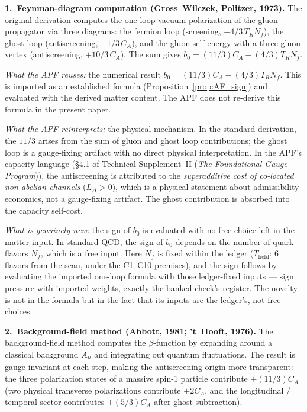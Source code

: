 \documentclass[11pt]{article}
\theoremstyle{definition}
\newcommand{\TSII}{Technical Supplement~II (\emph{The Foundational Gauge Program})}
\begin{document}
\smallskip\noindent\textbf{1.\ Feynman-diagram computation
(Gross--Wilczek, Politzer, 1973).}\quad
The original derivation computes the one-loop vacuum polarization of
the gluon propagator via three diagrams: the fermion loop (screening,
$-4/3\, T_R N_f$), the ghost loop (antiscreening, $+1/3\, C_A$), and
the gluon self-energy with a three-gluon vertex (antiscreening,
$+10/3\, C_A$).  The sum gives $b_0 = (11/3)C_A - (4/3)T_R N_f$.

\textit{What the APF reuses:} the numerical result
$b_0 = (11/3)C_A - (4/3)T_R N_f$.  This is imported as an established
formula (Proposition~\ref{prop:AF_sign}) and evaluated with the
derived matter content.  The APF does not re-derive this formula in
the present paper.

\textit{What the APF reinterprets:} the physical mechanism.  In the
standard derivation, the $11/3$ arises from the sum of gluon and ghost
loop contributions; the ghost loop is a gauge-fixing artifact with no
direct physical interpretation.  In the APF's capacity language
(\S4.1 of \TSII{}), the antiscreening is attributed to the
\emph{superadditive cost of co-located non-abelian channels}
($L_\Delta > 0$), which is a physical statement about admissibility
economics, not a gauge-fixing artifact.  The ghost contribution is
absorbed into the capacity self-cost.

\textit{What is genuinely new:} the sign of $b_0$ is evaluated with
no free choice left in the matter input.  In standard QCD, the sign
of $b_0$ depends on the number of quark flavors $N_f$, which is a
free input.  Here $N_f$ is fixed within the ledger
($T_{\mathrm{field}}$: 6 flavors from the scan, under the C1--C10
premises), and the sign follows by evaluating the imported one-loop
formula with those ledger-fixed inputs --- sign pressure with imported
weights, exactly the banked check's register.  The novelty is not in
the formula but in the fact that its inputs are the ledger's, not
free choices.

\smallskip\noindent\textbf{2.\ Background-field method
(Abbott, 1981; 't~Hooft, 1976).}\quad
The background-field method computes the $\beta$-function by expanding
around a classical background $\bar{A}_\mu$ and integrating out
quantum fluctuations.  The result is gauge-invariant at each step,
making the antiscreening origin more transparent: the three
polarization states of a massive spin-1 particle contribute
$+(11/3)C_A$ (two physical transverse polarizations contribute
$+2C_A$, and the longitudinal / temporal sector contributes
$+(5/3)C_A$ after ghost subtraction).
\end{document}
